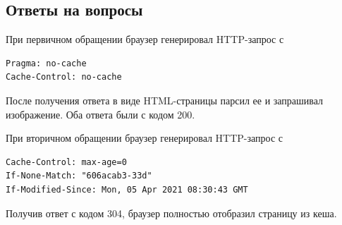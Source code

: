 \begin{center}
\end{center}

\subsection{Ответы на вопросы}

При первичном обращении браузер генерировал HTTP-запрос с

\begin{verbatim}
Pragma: no-cache
Cache-Control: no-cache
\end{verbatim}

После получения ответа в виде HTML-страницы парсил ее и запрашивал изображение.
Оба ответа были с кодом 200.

При вторичном обращении браузер генерировал HTTP-запрос с

\begin{verbatim}
Cache-Control: max-age=0
If-None-Match: "606acab3-33d"
If-Modified-Since: Mon, 05 Apr 2021 08:30:43 GMT
\end{verbatim}

Получив ответ с кодом 304, браузер полностью отобразил страницу из кеша.
